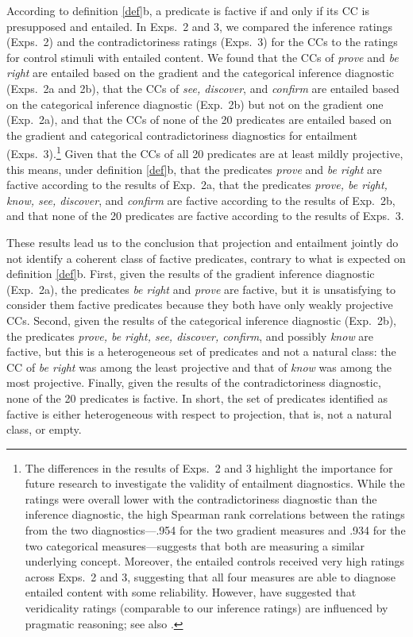 \documentclass{language}
\newcommand{\6}{\mbox{$[\hspace*{-.6mm}[$}}
\newcommand{\9}{\mbox{$]\hspace*{-.6mm}]$}}
\begin{document}
According to definition \ref{def}b, a predicate is factive if and only if its CC is presupposed and entailed. In Exps.~2 and 3, we compared the inference ratings (Exps.~2) and the contradictoriness ratings (Exps.~3) for the CCs to the ratings for control stimuli with entailed content. We found that the CCs of {\em prove} and {\em be right} are entailed based on the gradient and the categorical inference diagnostic (Exps.~2a and 2b), that the CCs of {\em see, discover}, and {\em confirm} are entailed based on the categorical inference diagnostic (Exp.~2b) but not on the gradient one (Exp.~2a), and that the CCs of none of the 20 predicates are entailed based on the gradient and categorical contradictoriness diagnostics for entailment (Exps.~3).\footnote{The differences in the results of Exps.~2 and 3 highlight the importance for future research to investigate the validity of entailment diagnostics. While the ratings were overall lower with the  contradictoriness diagnostic than the inference diagnostic, the high Spearman rank correlations between the ratings from the two diagnostics---.954 for the two gradient measures and .934 for the two categorical measures---suggests that both are measuring a similar underlying concept. Moreover, the entailed controls received very high ratings across Exps.~2 and 3, suggesting that all four measures are able to diagnose entailed content with some reliability.   However, \citet[329]{demarneffe-etal2012} have suggested that veridicality ratings (comparable to our inference ratings) are influenced by pragmatic reasoning; see also \citealt{pavlick-kwiatkowski2019}.} Given that the CCs of all 20 predicates are at least mildly projective, this means, under definition \ref{def}b, that the predicates {\em prove} and {\em be right} are factive according to the results of Exp.~2a, that the predicates {\em prove, be right, know, see, discover}, and {\em confirm} are factive according to the results of Exp.~2b, and that none of the 20 predicates are factive according to the results of Exps.~3.  

These results lead us to the conclusion that projection and entailment jointly do not identify a coherent class of factive predicates, contrary to what is expected on definition \ref{def}b. First, given the results of the gradient inference diagnostic (Exp.~2a), the predicates {\em be right} and {\em prove} are factive, but it is unsatisfying to consider them factive predicates because they both have only weakly projective CCs. Second, given the results of the categorical inference diagnostic (Exp.~2b), the predicates {\em prove, be right, see, discover, confirm}, and possibly {\em know} are factive, but this is a heterogeneous set of predicates and not a natural class: the CC of {\em be right} was among the least projective and that of {\em know} was among the most projective. Finally, given the results of the contradictoriness diagnostic, none of the 20 predicates is factive. In short, the set of predicates identified as factive is either heterogeneous with respect to projection, that is, not a natural class, or empty. 
\end{document}
